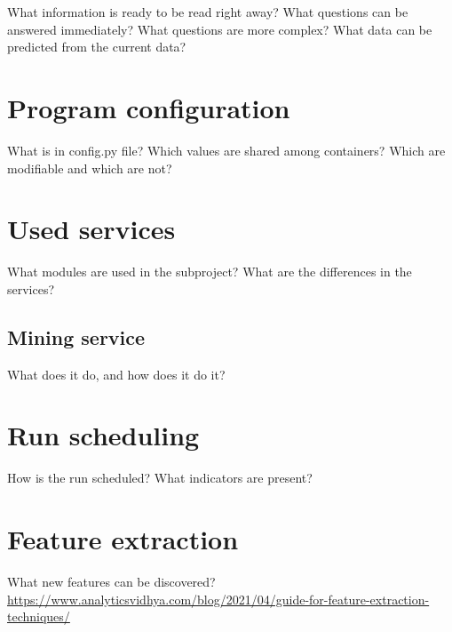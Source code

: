What information is ready to be read right away?
What questions can be answered immediately?
What questions are more complex?
What data can be predicted from the current data?


\section{Program configuration}
What is in config.py file?
Which values are shared among containers?
Which are modifiable and which are not?


\section{Used services}
What modules are used in the subproject?
What are the differences in the services?

\subsection{Mining service}
What does it do, and how does it do it?


\section{Run scheduling}
How is the run scheduled? What indicators are present?


\section{Feature extraction}
What new features can be discovered?
\url{https://www.analyticsvidhya.com/blog/2021/04/guide-for-feature-extraction-techniques/}